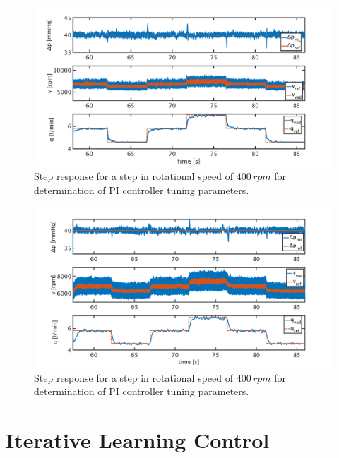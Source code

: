 \begin{figure}[ht]
  \centering
  \includegraphics[width=\textwidth]{images/chapt_5/pi_contr_chr_40.pdf}
  \caption[Step response for determination of PI controller tuning parameters]{Step response for a step in rotational speed of $400\,rpm$ for determination of PI controller tuning parameters.}
  \label{fig:pi_contr_chr_40}
\end{figure}

\begin{figure}[ht]
  \centering
  \includegraphics[width=\textwidth]{images/chapt_5/pi_contr_zn_40.pdf}
  \caption[Step response for determination of PI controller tuning parameters]{Step response for a step in rotational speed of $400\,rpm$ for determination of PI controller tuning parameters.}
  \label{fig:pi_contr_zn_40}
\end{figure}


\section{Iterative Learning Control}

